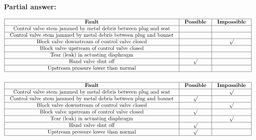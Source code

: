 





\noindent
{\bf Partial answer:}


$$\vbox{\offinterlineskip
\halign{\strut
\vrule \quad\hfil # \ \hfil & 
\vrule \quad\hfil # \ \hfil & 
\vrule \quad\hfil # \ \hfil \vrule \cr
\noalign{\hrule}
%
{\bf Fault} & {\bf Possible} & {\bf Impossible} \cr
%
\noalign{\hrule}
%
Control valve stem jammed by metal debris between plug and seat &  &  \cr
%
\noalign{\hrule}
%
Control valve stem jammed by metal debris between plug and bonnet &  &  \cr
%
\noalign{\hrule}
%
Block valve downstream of control valve closed &  & $\surd$ \cr
%
\noalign{\hrule}
%
Block valve upstream of control valve closed &  &  \cr
%
\noalign{\hrule}
%
Tear (leak) in actuating diaphragm &  &  \cr
%
\noalign{\hrule}
%
Hand valve shut off & $\surd$ &  \cr
%
\noalign{\hrule}
%
Upstream pressure lower than normal &  &  \cr
%
\noalign{\hrule}
} %
}$$ %








$$\vbox{\offinterlineskip
\halign{\strut
\vrule \quad\hfil # \ \hfil & 
\vrule \quad\hfil # \ \hfil & 
\vrule \quad\hfil # \ \hfil \vrule \cr
\noalign{\hrule}
%
{\bf Fault} & {\bf Possible} & {\bf Impossible} \cr
%
\noalign{\hrule}
%
Control valve stem jammed by metal debris between plug and seat &  & $\surd$ \cr
%
\noalign{\hrule}
%
Control valve stem jammed by metal debris between plug and bonnet & $\surd$ &  \cr
%
\noalign{\hrule}
%
Block valve downstream of control valve closed &  & $\surd$ \cr
%
\noalign{\hrule}
%
Block valve upstream of control valve closed & $\surd$ &  \cr
%
\noalign{\hrule}
%
Tear (leak) in actuating diaphragm &  & $\surd$ \cr
%
\noalign{\hrule}
%
Hand valve shut off & $\surd$ &  \cr
%
\noalign{\hrule}
%
Upstream pressure lower than normal & $\surd$ &  \cr
%
\noalign{\hrule}
} %
}$$ %

